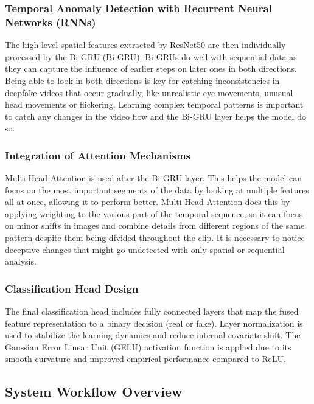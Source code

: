 \documentclass[conference]{IEEEtran}
\begin{document}
\subsubsection{Temporal Anomaly Detection with Recurrent Neural Networks (RNNs)}


The high-level spatial features extracted by ResNet50 are then individually processed by the Bi-GRU (Bi-GRU). Bi-GRUs do well with sequential data as they can capture the influence of earlier steps on later ones in both directions. Being able to look in both directions is key for catching inconsistencies in deepfake videos that occur gradually, like unrealistic eye movements, unusual head movements or flickering. Learning complex temporal patterns is important to catch any changes in the video flow and the Bi-GRU layer helps the model do so.


\subsubsection{Integration of Attention Mechanisms}



Multi-Head Attention is used after the Bi-GRU layer. This helps the model can focus on the most important segments of the data by looking at multiple features all at once, allowing it to perform better. Multi-Head Attention does this by applying weighting to the various part of the temporal sequence, so it can focus on minor shifts in images and combine details from different regions of the same pattern despite them being divided throughout the clip. It is necessary to notice deceptive changes that might go undetected with only spatial or sequential analysis.

\subsubsection{Classification Head Design}
The final classification head includes fully connected layers that map the fused feature representation to a binary decision (real or fake). Layer normalization is used to stabilize the learning dynamics and reduce internal covariate shift. The Gaussian Error Linear Unit (GELU) activation function is applied due to its smooth curvature and improved empirical performance compared to ReLU.

\subsection{System Workflow Overview}
\end{document}
